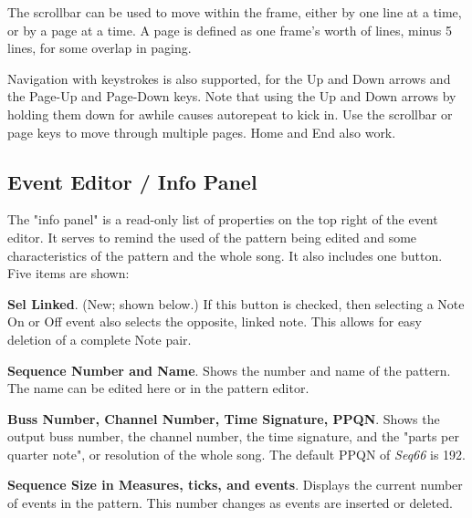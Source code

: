    The scrollbar can be used to move within the frame, either by one line at a
   time, or by a page at a time.  A page is defined as one frame's worth of
   lines, minus 5 lines, for some overlap in paging.

   Navigation with keystrokes is also supported, for the Up and Down arrows and
   the Page-Up and Page-Down keys.  Note that using the Up and Down arrows by
   holding them down for awhile causes autorepeat to kick in.
   Use the scrollbar or page keys to
   move through multiple pages.  Home and End also work.

\subsection{Event Editor / Info Panel}
\label{subsec:event_editor_info}

   The "info panel" is a read-only list of properties on the top right
   of the event editor.  It serves to remind the used of the pattern being
   edited and some characteristics of the pattern and the whole song.
   It also includes one button.
   Five items are shown:

   \begin{enumber}
      \item \textbf{Sel Linked}. (New; shown below.)
         If this button is checked, then selecting a Note On or Off event
         also selects the opposite, linked note.
         This allows for easy deletion of a complete Note pair.
      \item \textbf{Sequence Number and Name}.
         Shows the number and name of the pattern.
         The name can be edited here or in the pattern editor.
      \item \textbf{Buss Number, Channel Number, Time Signature, PPQN}.
         Shows the output buss number, the channel number,
         the time signature, and
         the "parts per quarter note", or resolution of the
         whole song.  The default PPQN of \textsl{Seq66} is 192.
      \item \textbf{Sequence Size in Measures, ticks, and events}.
         Displays the current number of events in the pattern.
         This number changes as events are inserted or deleted.
   \end{enumber}

